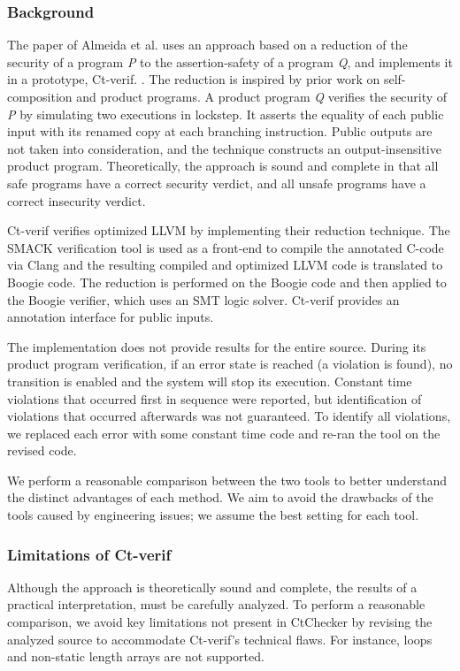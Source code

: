\subsubsection{Background}
The paper of Almeida et al. uses an approach based on a reduction of the
security of a program \textit{P} to the assertion-safety of a program
\textit{Q}, and implements it in a prototype, Ct-verif.
\cite{almeida2016verifying}. The reduction is inspired by prior work
on self-composition and product programs.  A product program \textit{Q}
verifies the security of \textit{P} by simulating two executions in lockstep.
It asserts the equality of each public input with its renamed copy at each
branching instruction. Public outputs are not taken into consideration, and
the technique constructs an output-insensitive product program.  Theoretically,
the approach is sound and complete in that all safe programs have a correct
security verdict, and all unsafe programs have a correct insecurity verdict.

Ct-verif verifies optimized LLVM by implementing their reduction
technique.  The SMACK verification tool is used as a front-end to compile the
annotated C-code via Clang and the resulting compiled and optimized LLVM code
is translated to Boogie code.  The reduction is performed on the Boogie code and
then applied to the Boogie verifier, which uses an SMT logic solver.  Ct-verif
provides an annotation interface for public inputs.

The implementation does not provide results for the entire source. During its
product program verification, if an error state is reached (a violation is
found), no transition is enabled and the system will stop its execution. Constant
time violations that occurred first in sequence were reported, but
identification of violations that occurred afterwards was not guaranteed.
To identify all violations, we replaced each error with some constant time
code and re-ran the tool on the revised code.

We perform a reasonable comparison between the two tools to better understand
the distinct advantages of each method. We aim to avoid the drawbacks of the tools
caused by engineering issues; we assume the best setting for each tool.

\subsubsection{Limitations of Ct-verif}
Although the approach is theoretically sound and complete, the results of
a practical interpretation, must be carefully analyzed.  To perform
a reasonable comparison, we avoid key limitations not present in CtChecker by
revising the analyzed source to accommodate Ct-verif's technical flaws.  For
instance, loops and non-static length arrays are not supported.

